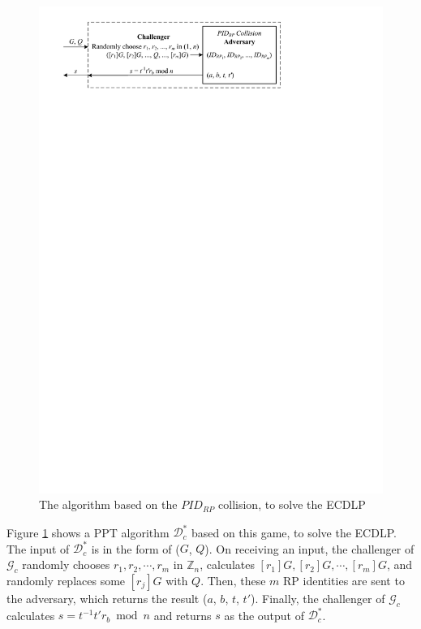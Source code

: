 \begin{figure}[tb]
  \centering
  \includegraphics[width=0.97\linewidth]{fig/ecdlp_algorithm.pdf}
  \caption{The algorithm based on the $PID_{RP}$ collision, to solve the ECDLP}
  \label{fig:ecdlp_algorithm}
\end{figure}


Figure \ref{fig:ecdlp_algorithm} shows a PPT algorithm $\mathcal{D}^*_c$ based on this game, to solve the ECDLP.
The input of $\mathcal{D}^*_c$ is in the form of ($G$, $Q$).
On receiving an input, the challenger of $\mathcal{G}_c$ randomly chooses $r_1, r_2, \cdots, r_m$ in $\mathbb{Z}_n$,
 calculates $[r_1]G, [r_2]G, \cdots, [r_m]G$,
 and randomly replaces some $[r_j]G$ with $Q$.
Then,
    these $m$ RP identities are sent to the adversary,
which returns the result ($a$, $b$, $t$, $t'$).
Finally, the challenger of $\mathcal{G}_c$ calculates $s = t^{-1}t'r_b \bmod n$ and returns $s$ as the output of $\mathcal{D}^*_c$.

